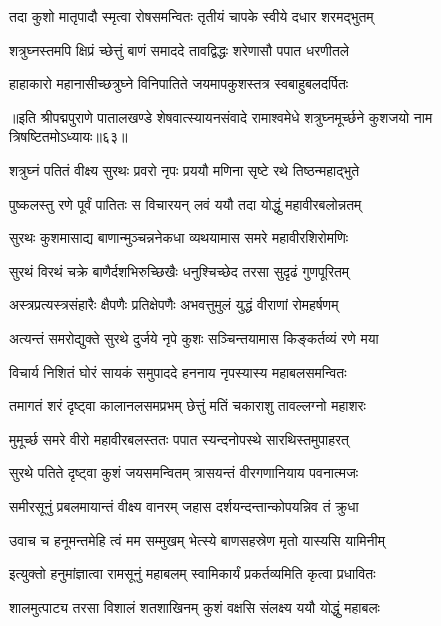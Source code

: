 \twolineshloka
{तदा कुशो मातृपादौ स्मृत्वा रोषसमन्वितः}
{तृतीयं चापके स्वीये दधार शरमद्भुतम्}%

\twolineshloka
{शत्रुघ्नस्तमपि क्षिप्रं च्छेत्तुं बाणं समाददे}
{तावद्विद्धः शरेणासौ पपात धरणीतले}%

\twolineshloka
{हाहाकारो महानासीच्छत्रुघ्ने विनिपातिते}
{जयमापकुशस्तत्र स्वबाहुबलदर्पितः}%

{॥इति श्रीपद्मपुराणे पातालखण्डे शेषवात्स्यायनसंवादे रामाश्वमेधे शत्रुघ्नमूर्च्छने कुशजयो नाम त्रिषष्टितमोऽध्यायः॥६३॥}

\resetShloka


\twolineshloka
{शत्रुघ्नं पतितं वीक्ष्य सुरथः प्रवरो नृपः}
{प्रययौ मणिना सृष्टे रथे तिष्ठन्महाद्भुते}%

\twolineshloka
{पुष्कलस्तु रणे पूर्वं पातितः स विचारयन्}
{लवं ययौ तदा योद्धुं महावीरबलोन्नतम्}%

\twolineshloka
{सुरथः कुशमासाद्य बाणान्मुञ्चन्ननेकधा}
{व्यथयामास समरे महावीरशिरोमणिः}%

\twolineshloka
{सुरथं विरथं चक्रे बाणैर्दशभिरुच्छिखैः}
{धनुश्चिच्छेद तरसा सुदृढं गुणपूरितम्}%

\twolineshloka
{अस्त्रप्रत्यस्त्रसंहारैः क्षैपणैः प्रतिक्षेपणैः}
{अभवत्तुमुलं युद्धं वीराणां रोमहर्षणम्}%

\twolineshloka
{अत्यन्तं समरोद्युक्ते सुरथे दुर्जये नृपे}
{कुशः सञ्चिन्तयामास किङ्कर्तव्यं रणे मया}%

\twolineshloka
{विचार्य निशितं घोरं सायकं समुपाददे}
{हननाय नृपस्यास्य महाबलसमन्वितः}%

\twolineshloka
{तमागतं शरं दृष्ट्वा कालानलसमप्रभम्}
{छेत्तुं मतिं चकाराशु तावल्लग्नो महाशरः}%

\twolineshloka
{मुमूर्च्छ समरे वीरो महावीरबलस्ततः}
{पपात स्यन्दनोपस्थे सारथिस्तमुपाहरत्}%

\twolineshloka
{सुरथे पतिते दृष्ट्वा कुशं जयसमन्वितम्}
{त्रासयन्तं वीरगणानियाय पवनात्मजः}%

\twolineshloka
{समीरसूनुं प्रबलमायान्तं वीक्ष्य वानरम्}
{जहास दर्शयन्दन्तान्कोपयन्निव तं क्रुधा}%

\twolineshloka
{उवाच च हनूमन्तमेहि त्वं मम सम्मुखम्}
{भेत्स्ये बाणसहस्रेण मृतो यास्यसि यामिनीम्}%

\twolineshloka
{इत्युक्तो हनुमांज्ञात्वा रामसूनुं महाबलम्}
{स्वामिकार्यं प्रकर्तव्यमिति कृत्वा प्रधावितः}%

\twolineshloka
{शालमुत्पाट्य तरसा विशालं शतशाखिनम्}
{कुशं वक्षसि संलक्ष्य ययौ योद्धुं महाबलः}%


